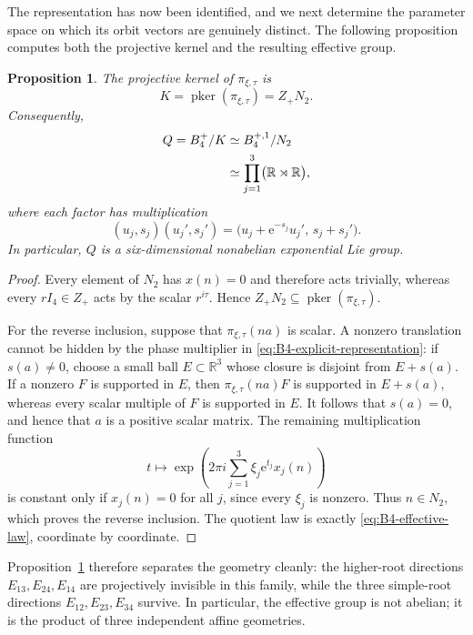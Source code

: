\documentclass[reqno]{amsart}
\numberwithin{equation}{section}
\newtheorem{proposition}[theorem]{Proposition}
\theoremstyle{definition}
\theoremstyle{remark}
\newcommand{\R}{\mathbb R}
\newcommand{\pker}{\operatorname{pker}}
\newcommand{\e}{\mathrm e}
\begin{document}
The representation has now been identified, and we next determine the
parameter space on which its orbit vectors are genuinely distinct.  The
following proposition computes both the projective kernel and the resulting
effective group.

\begin{proposition}
\label{prop:B4-projective-kernel}
The projective kernel of $\pi_{\xi,\tau}$ is
\begin{equation}
 K=\pker(\pi_{\xi,\tau})=Z_+N_2.
 \label{eq:B4-projective-kernel}
\end{equation}
Consequently,
\begin{align}
 Q=B_4^+/K
 &\simeq B_4^{+,1}/N_2 \notag\\
 &\simeq\prod_{j=1}^3\bigl(\R\rtimes\R\bigr),
 \label{eq:B4-effective-quotient}
\end{align}
where each factor has multiplication
\begin{equation}
 (u_j,s_j)(u_j',s_j')
 =\bigl(u_j+\e^{-s_j}u_j',\,s_j+s_j'\bigr).
 \label{eq:B4-affine-law}
\end{equation}
In particular, $Q$ is a six-dimensional nonabelian exponential Lie group.
\end{proposition}

\begin{proof}
Every element of $N_2$ has $x(n)=0$ and therefore acts trivially, whereas
every $rI_4\in Z_+$ acts by the scalar $r^{i\tau}$.  Hence
$Z_+N_2\subseteq\pker(\pi_{\xi,\tau})$.

For the reverse inclusion, suppose that $\pi_{\xi,\tau}(na)$ is scalar.
A nonzero translation cannot be hidden by the phase multiplier in
\eqref{eq:B4-explicit-representation}: if $s(a)\neq0$, choose a small ball
$E\subset\R^3$ whose closure is disjoint from $E+s(a)$.  If a nonzero $F$
is supported in $E$, then $\pi_{\xi,\tau}(na)F$ is supported in $E+s(a)$,
whereas every scalar multiple of $F$ is supported in $E$.  It follows that
$s(a)=0$, and hence that $a$ is a positive scalar matrix.  The remaining
multiplication function
\[
 t\longmapsto
 \exp\left(2\pi i\sum_{j=1}^3\xi_j\e^{t_j}x_j(n)\right)
\]
is constant only if $x_j(n)=0$ for all $j$, since every $\xi_j$ is nonzero.
Thus $n\in N_2$, which proves the reverse inclusion.  The quotient law is
exactly \eqref{eq:B4-effective-law}, coordinate by coordinate.
\end{proof}

Proposition~\ref{prop:B4-projective-kernel} therefore separates the geometry
cleanly: the higher-root directions $E_{13},E_{24},E_{14}$ are projectively
invisible in this family, while the three simple-root directions
$E_{12},E_{23},E_{34}$ survive.  In particular, the effective group is not
abelian; it is the product of three independent affine geometries.
\end{document}
